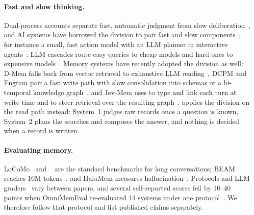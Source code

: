 \paragraph{Fast and slow thinking.}
Dual-process accounts separate fast, automatic judgment from slow deliberation~\citep{kahneman2011thinking}, and AI systems have borrowed the division to pair fast and slow components~\citep{booch2021thinking}, for instance a small, fast action model with an LLM planner in interactive agents~\citep{lin2023swiftsage}; LLM cascades route easy queries to cheap models and hard ones to expensive models~\citep{chen2023frugalgpt}.
Memory systems have recently adopted the division as well: D-Mem falls back from vector retrieval to exhaustive LLM reading~\citep{you2026dmem}, DCPM and Engram pair a fast write path with slow consolidation into schemas or a bi-temporal knowledge graph~\citep{fei2026dcpm,wang2026engram}, and Jev-Mem uses \jev{} to type and link each turn at write time and to steer retrieval over the resulting graph~\citep{jiang2026jevmem}.
\sys{} applies the division on the read path instead: System~1 judges raw records once a question is known, System~2 plans the searches and composes the answer, and nothing is decided when a record is written.

\paragraph{Evaluating memory.}
LoCoMo~\citep{maharana2024locomo} and \lme~\citep{wu2025longmemeval} are the standard benchmarks for long conversations; BEAM reaches 10M tokens~\citep{beam2026}, and HaluMem measures hallucination~\citep{halumem2025}.
Protocols and LLM graders~\citep{zheng2023judging} vary between papers, and several self-reported scores fell by 10--40 points when OmniMemEval re-evaluated 14 systems under one protocol~\citep{omnimemeval2026}.
We therefore follow that protocol and list published claims separately.
